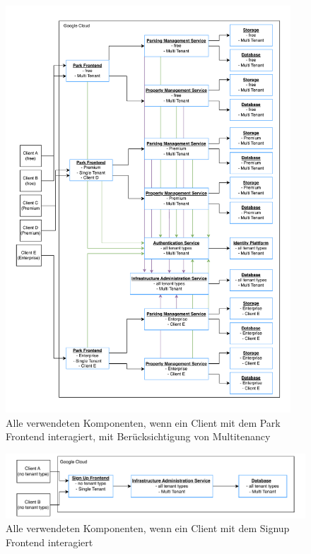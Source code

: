 \begin{figure}[ht]
	\centering
	\includegraphics[width=0.95\textwidth]{resources/03-runtime-view/pdf/components-frontend-park.pdf}
	\caption{Alle verwendeten Komponenten, wenn ein Client mit dem Park Frontend interagiert, mit Berücksichtigung von Multitenancy}
	\label{fig:components-park-frontend}
\end{figure}

\begin{figure}[ht]
	\centering
	\includegraphics[width=\textwidth]{resources/03-runtime-view/pdf/components-frontend-signup.pdf}
	\caption{Alle verwendeten Komponenten, wenn ein Client mit dem Signup Frontend interagiert}
	\label{fig:components-signup-frontend}
\end{figure}

